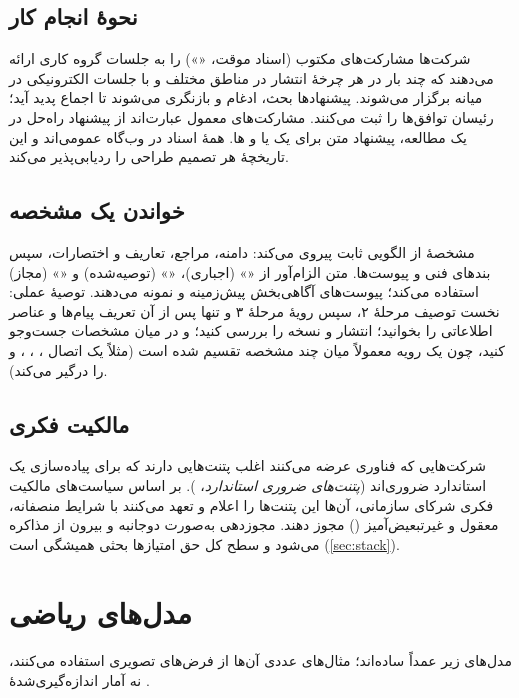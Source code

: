 \documentclass[11pt,a4paper]{article}
\begin{document}
\begin{acnfigure}
  \caption{از مورد مطالعه تا مشخصه، و چرخهٔ درخواست تغییر.}
  \label{fig:cr}
\end{acnfigure}

\subsection{نحوهٔ انجام کار}
شرکت‌ها مشارکت‌های مکتوب (اسناد موقت، «») را به جلسات گروه کاری ارائه می‌دهند که چند بار در هر چرخهٔ انتشار در
مناطق مختلف و با جلسات الکترونیکی در میانه برگزار می‌شوند. پیشنهادها بحث، ادغام و بازنگری می‌شوند تا اجماع پدید آید؛
رئیسان توافق‌ها را ثبت می‌کنند. مشارکت‌های معمول عبارت‌اند از پیشنهاد راه‌حل در یک مطالعه، پیشنهاد متن برای یک  یا
 و ها. همهٔ اسناد در وب‌گاه  عمومی‌اند و این تاریخچهٔ هر تصمیم طراحی را ردیابی‌پذیر می‌کند.

\subsection{خواندن یک مشخصه}
مشخصهٔ  از الگویی ثابت پیروی می‌کند: دامنه، مراجع، تعاریف و اختصارات، سپس بندهای فنی و پیوست‌ها. متن الزام‌آور از
«» (اجباری)، «» (توصیه‌شده) و «» (مجاز) استفاده می‌کند؛ پیوست‌های آگاهی‌بخش پیش‌زمینه و نمونه
می‌دهند. توصیهٔ عملی: نخست توصیف مرحلهٔ ۲، سپس رویهٔ مرحلهٔ ۳ و تنها پس از آن تعریف پیام‌ها و عناصر اطلاعاتی را بخوانید؛ انتشار
و نسخه را بررسی کنید؛ و در میان مشخصات جست‌وجو کنید، چون یک رویه معمولاً میان چند مشخصه تقسیم شده است (مثلاً یک اتصال
، ، ،  و  را درگیر می‌کند).

\subsection{مالکیت فکری}
شرکت‌هایی که فناوری عرضه می‌کنند اغلب پتنت‌هایی دارند که برای پیاده‌سازی یک استاندارد ضروری‌اند (\emph{پتنت‌های ضروری
استاندارد}، ). بر اساس سیاست‌های مالکیت فکری شرکای سازمانی، آن‌ها این پتنت‌ها را اعلام و تعهد می‌کنند با شرایط
منصفانه، معقول و غیرتبعیض‌آمیز () مجوز دهند. مجوزدهی به‌صورت دوجانبه و بیرون از  مذاکره می‌شود و
سطح کل حق امتیازها بحثی همیشگی است (\cref{sec:stack}).

\section{مدل‌های ریاضی}
مدل‌های زیر عمداً ساده‌اند؛ مثال‌های عددی آن‌ها از فرض‌های تصویری استفاده می‌کنند، نه آمار اندازه‌گیری‌شدهٔ .
\end{document}
